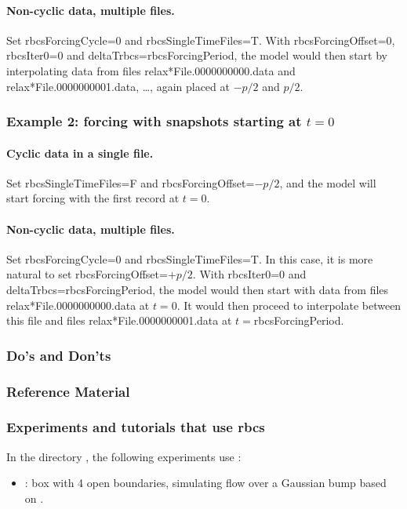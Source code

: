 \paragraph{Non-cyclic data, multiple files.}  Set rbcsForcingCycle=0 and
rbcsSingleTimeFiles=T.  With rbcsForcingOffset=0, rbcsIter0=0 and
deltaTrbcs=rbcsForcingPeriod, the model would then start by interpolating data from
files relax*File.0000000000.data and relax*File.0000000001.data, \dots,
again placed at $-p/2$ and $p/2$.


\subsubsection{Example 2: forcing with snapshots starting at $t=0$}

\paragraph{Cyclic data in a single file.}  Set rbcsSingleTimeFiles=F and
rbcsForcingOffset=$-p/2$, and the model will start forcing with the first
record at $t=0$.

\paragraph{Non-cyclic data, multiple files.}  Set rbcsForcingCycle=0 and
rbcsSingleTimeFiles=T.  In this case, it is more natural to set
rbcsForcingOffset=$+p/2$.
With rbcsIter0=0 and deltaTrbcs=rbcsForcingPeriod, the model would then start
with data from files relax*File.0000000000.data at $t=0$.
It would then proceed to interpolate between this file and files
relax*File.0000000001.data at $t={}$rbcsForcingPeriod.


\subsubsection{Do's and Don'ts}

\subsubsection{Reference Material}

\subsubsection{Experiments and tutorials that use rbcs}
\label{sec:pkg:rbcs:experiments}

In the directory , the following experiments use
:
\begin{itemize}
\item {}: box with 4 open boundaries, simulating flow over a
  Gaussian bump based on \citet{adcroft:97}.
\end{itemize}




